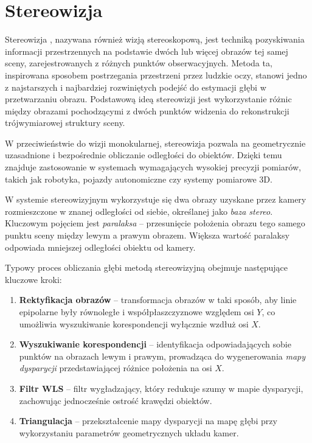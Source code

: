 \documentclass[magisterska]{pracadypl}
\begin{document}
\chapter{Stereowizja}

Stereowizja \cite{rao}, nazywana również wizją stereoskopową, jest techniką pozyskiwania informacji przestrzennych na podstawie dwóch lub więcej obrazów tej samej sceny, zarejestrowanych z różnych punktów obserwacyjnych. Metoda ta, inspirowana sposobem postrzegania przestrzeni przez ludzkie oczy, stanowi jedno z najstarszych i najbardziej rozwiniętych podejść do estymacji głębi w przetwarzaniu obrazu.
Podstawową ideą stereowizji jest wykorzystanie różnic między obrazami pochodzącymi z dwóch punktów widzenia do rekonstrukcji trójwymiarowej struktury sceny.

W przeciwieństwie do wizji monokularnej, stereowizja pozwala na geometrycznie uzasadnione i bezpośrednie obliczanie odległości do obiektów. Dzięki temu znajduje zastosowanie w systemach wymagających wysokiej precyzji pomiarów, takich jak robotyka, pojazdy autonomiczne czy systemy pomiarowe 3D.

W systemie stereowizyjnym wykorzystuje się dwa obrazy uzyskane przez kamery rozmieszczone w znanej odległości od siebie, określanej jako \textit{baza stereo}. Kluczowym pojęciem jest \textit{paralaksa} – przesunięcie położenia obrazu tego samego punktu sceny między lewym a prawym obrazem. Większa wartość paralaksy odpowiada mniejszej odległości obiektu od kamery.

Typowy proces obliczania głębi metodą stereowizyjną obejmuje następujące kluczowe kroki:

\begin{enumerate}
    \item \textbf{Rektyfikacja obrazów} – transformacja obrazów w taki sposób, aby linie epipolarne były równoległe i współpłaszczyznowe względem osi \(Y\), co umożliwia wyszukiwanie korespondencji wyłącznie wzdłuż osi \(X\).
    \item \textbf{Wyszukiwanie korespondencji} – identyfikacja odpowiadających sobie punktów na obrazach lewym i prawym, prowadząca do wygenerowania \textit{mapy dysparycji} przedstawiającej różnice położenia na osi \(X\).
    \item \textbf{Filtr WLS} – filtr wygładzający, który redukuje szumy w mapie dysparycji, zachowując jednocześnie ostrość krawędzi obiektów.
    \item \textbf{Triangulacja} – przekształcenie mapy dysparycji na mapę głębi przy wykorzystaniu parametrów geometrycznych układu kamer.
\end{enumerate}
\end{document}
